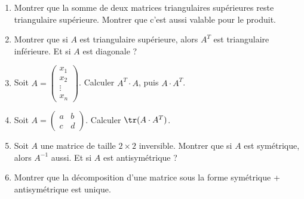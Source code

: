 \documentclass[class=report,crop=false]{standalone}
\begin{document}
\begin{miniexercices}
\sauteligne
\begin{enumerate}
  \item Montrer que la somme de deux matrices triangulaires supérieures reste triangulaire supérieure.
  Montrer que c'est aussi valable pour le produit.

  \item Montrer que si $A$ est triangulaire supérieure, alors $A^T$ est triangulaire inférieure.
  Et si $A$ est diagonale ?

  \item Soit $A = \left(\begin{smallmatrix}x_1 \\ x_2 \\ \vdots \\ x_n \end{smallmatrix} \right)$.
  Calculer $A^T \cdot A$, puis $A\cdot A^T$.

  \item Soit $A=\left(\begin{smallmatrix}a&b\\c&d\end{smallmatrix}\right)$.
  Calculer $\tr(A\cdot A^T)$.

  \item Soit $A$ une matrice de taille $2\times 2$ inversible. Montrer
  que si $A$ est symétrique, alors $A^{-1}$ aussi. Et si $A$ est antisymétrique ?

  \item Montrer que la décomposition d'une matrice sous la forme
  \og symétrique + antisymétrique \fg{} est unique.

\end{enumerate}
\end{miniexercices}


\bigskip
\bigskip


\finchapitre
\end{document}
